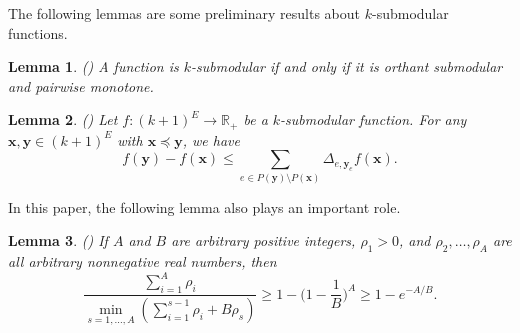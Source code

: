 \documentclass[preprint,12pt]{elsarticle}
\newtheorem{lemma}{Lemma}
\def\vn{\varnothing}
\def\bx{\boldsymbol{x}}
\def\by{\boldsymbol{y}}
\begin{document}
The following lemmas are some preliminary results about $k$-submodular functions.
\begin{lemma}\label{mon-ksub}
(\cite{JS}) A function is $k$-submodular if and only if it is orthant submodular and pairwise monotone.
\end{lemma}

\begin{lemma}\label{lem-ksub}
(\cite{TWC})
Let $f : (k+1)^E \rightarrow \mathbb{R}_+$ be a $k$-submodular function. For any $\bx,\by\in (k+1)^E$ with $\bx\preceq \by$, we have
\[
f(\by)-f(\bx)\leq \sum_{e\in P(\by)\setminus P(\bx)}\Delta_{e,\by_e}f(\bx).
\]
\end{lemma}


%

In this paper, the following lemma also plays an important role.
\begin{lemma}\label{lemA111}(\cite{L})
If $A$ and $B$ are  arbitrary positive integers, $\rho_1>0$, and
$\rho_2,\ldots,\rho_A$ are all arbitrary nonnegative real numbers, then
\[
\frac{\sum_{i=1}^{A}\rho_i}{\min_{s=1, \dots, A}(\sum_{i=1}^{s-1}\rho_i+B\rho_s)}\ge 1-\bigg( 1-\frac{1}{B}\bigg) ^A\geq 1-e^{-A/B}.
\]
\end{lemma}
\end{document}
